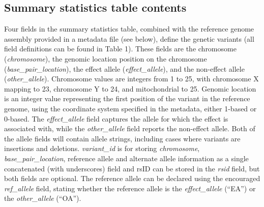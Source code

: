 \documentclass[11pt]{article}
\begin{document}
\subsection{Summary statistics table contents}
Four fields in the summary statistics table, combined with the reference genome assembly provided in a metadata file (see below), define the genetic variants (all field definitions can be found in Table 1). These fields are the chromosome (\textit{chromosome}), the genomic location position on the chromosome (\textit{base\_pair\_location}), the effect allele (\textit{effect\_allele}), and the non-effect allele (\textit{other\_allele}). Chromosome values are integers from 1 to 25, with chromosome X mapping to 23, chromosome Y to 24, and mitochondrial to 25. Genomic location is an integer value representing the first position of the variant in the reference genome, using the coordinate system specified in the metadata, either 1-based or 0-based. The \textit{effect\_allele} field captures the allele for which the effect is associated with, while the \textit{other\_allele} field reports the non-effect allele. Both of the allele fields will contain allele strings, including cases where variants are insertions and deletions. \textit{variant\_id} is for storing \textit{chromosome}, \textit{base\_pair\_location}, reference allele and alternate allele information as a single concatenated (with underscores) field and rsID can be stored in the \textit{rsid} field, but both fields are optional. The reference allele can be declared using the encouraged \textit{ref\_allele} field, stating whether the reference allele is the \textit{effect\_allele} (``EA'') or the \textit{other\_allele} (``OA'').
\end{document}
